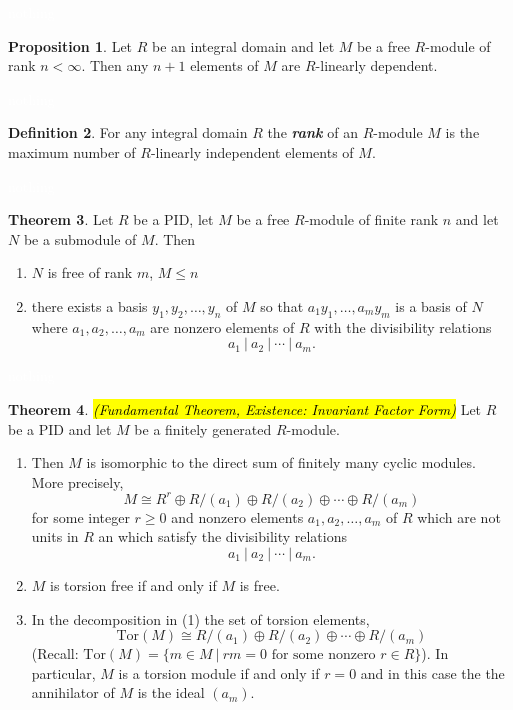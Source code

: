 \documentclass{article}
\theoremstyle{definition}
\newtheorem{thm}{Theorem}[section]
\newtheorem{prop}[thm]{Proposition}
\newtheorem{defn}[thm]{Definition}
\newcommand{\nl}{\textcolor{white}{nothing}}
\newcommand{\Tor}{\text{Tor}}
\begin{document}
\nl

\begin{prop}
Let $R$ be an integral domain and let $M$ be a free $R$-module of rank $n<\infty$. Then any $n + 1$ elements of $M$ are $R$-linearly dependent.
\end{prop}

\nl

\begin{defn}
For any integral domain $R$ the \textit{\textbf{rank}} of an $R$-module $M$ is the maximum number of $R$-linearly independent elements of $M$.
\end{defn}

\nl

\begin{thm}
Let $R$ be a PID, let $M$ be a free $R$-module of finite rank $n$ and let $N$ be a submodule of $M$. Then
\begin{enumerate}
\item $N$ is free of rank $m$, $M\leq n$
\item there exists a basis $y_1,y_2,\ldots,y_n$ of $M$ so that $a_1y_1,\ldots,a_my_m$ is a basis of $N$ where $a_1, a_2, \ldots, a_m$ are nonzero elements of $R$ with the divisibility relations
\[a_1\ |\ a_2\ |\ \cdots\ |\ a_m.\]
\end{enumerate}
\end{thm}

\nl

\begin{thm}\textit{\hl{(Fundamental Theorem, Existence: Invariant Factor Form)}}
Let $R$ be a PID and let $M$ be a finitely generated $R$-module.
\begin{enumerate}
\item Then $M$ is isomorphic to the direct sum of finitely many cyclic modules. More precisely,
\[M\cong R^r\oplus R/(a_1) \oplus R/(a_2) \oplus \cdots \oplus R/(a_m)\]
for some integer $r\geq 0$ and nonzero elements $a_1, a_2,\ldots, a_m$ of $R$ which are not units in $R$ an which satisfy the divisibility relations 
\[a_1\ |\ a_2\ |\ \cdots\ |\ a_m.\]

\item $M$ is torsion free if and only if $M$ is free.
\item In the decomposition in (1) the set of torsion elements,
\[\Tor(M) \cong R/(a_1) \oplus R/(a_2) \oplus \cdots \oplus R/(a_m)\]
(Recall: $\Tor(M) = \{m\in M\ |\ rm = 0\text{ for some nonzero }r\in R\}$). In particular, $M$ is a torsion module if and only if $r = 0$ and in this case the the annihilator of $M$ is the ideal $(a_m)$.
\end{enumerate}
\end{thm}
\end{document}
